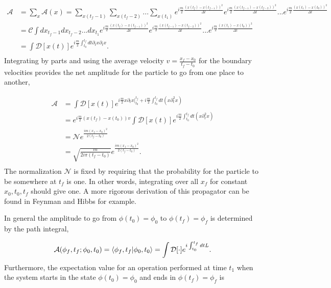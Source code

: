 \begin{equation}
\begin{split}
\mathcal{A} &= \sum_{x} \mathcal{A}(x) = \sum_{x(t_f-1)} \sum_{x(t_f-2)} ... \sum_{x(t_1)} 
e^{i\frac{m}{2}\frac{(x(t_f) - x(t_{f-1}))^2}{\Delta t}}e^{i\frac{m}{2}\frac{(x(t_{f-1}) - x(t_{f-2}))^2}{\Delta t}}...
e^{i\frac{m}{2}\frac{(x(t_1) - x(t_{0}))^2}{\Delta t}} \\
&= \mathcal{C} \int dx_{t_f-1}dx_{t_f-2}...dx_{t_1} 
e^{i\frac{m}{2}\frac{(x(t_f) - x(t_{f-1}))^2}{\Delta t}}e^{i\frac{m}{2}\frac{(x(t_{f-1}) - x(t_{f-2}))^2}{\Delta t}}...
e^{i\frac{m}{2}\frac{(x(t_1) - x(t_{0}))^2}{\Delta t}}\\
& = \int \mathcal{D}[x(t)] e^{i\frac{m}{2}\int_{t_0}^{t_f} dt \partial_t x \partial_t x}.\\
\end{split}
\end{equation} 
Integrating by parts and using the average velocity $v = \frac{x_f-x_0}{t_f - t_0}$ for the boundary velocities provides the net amplitude for the particle to go from one place to another,

\begin{equation}
\begin{split}
\mathcal{A} &= \int \mathcal{D}[x(t)] e^{i\frac{m}{2}x\partial_t x|^{t_f}_{t_0} + i\frac{m}{2}\int_{t_0}^{t_f} dt (x \partial^2_t x)} \\ 
            &= e^{i\frac{m}{2}(x(t_f) - x(t_0))v}\int \mathcal{D}[x(t)] e^{i\frac{m}{2}\int_{t_0}^{t_f} dt (x \partial^2_t x)} \\
            &= \mathcal{N}e^{\frac{im(x_f - x_0)^2}{2(t_f - t_0)}} \\
            &= \sqrt{\frac{m}{2i\pi(t_f-t_0)}}e^{\frac{im(x_f - x_0)^2}{2(t_f - t_0)}}. \\
\end{split}
\end{equation}
The normalization $\mathcal{N}$ is fixed by requiring that the probability for the particle to be somewhere at $t_f$ is one. In other words, integrating over all $x_f$ for constant $x_0, t_0, t_f$ should give one. A more rigorous derivation of this propagator can be found in {\color{red} Feynman and Hibbs} for example.

In general the amplitude to go from $\phi(t_0) = \phi_0$ to $\phi(t_f) = \phi_f$ is determined by the path integral, 

\begin{equation}
\mathcal{A}(\phi_f, t_f; \phi_0, t_0) = \braket{\phi_f,t_f|\phi_0,t_0} = \int \mathcal{D}[\cdot] e^{i\int_{t_0}^{t_f} dt L}.
\end{equation}
Furthermore, the expectation value for an operation performed at time $t_1$ when the system starts in the state $\phi(t_0) = \phi_0$ and ends in $\phi(t_f) = \phi_f$ is

